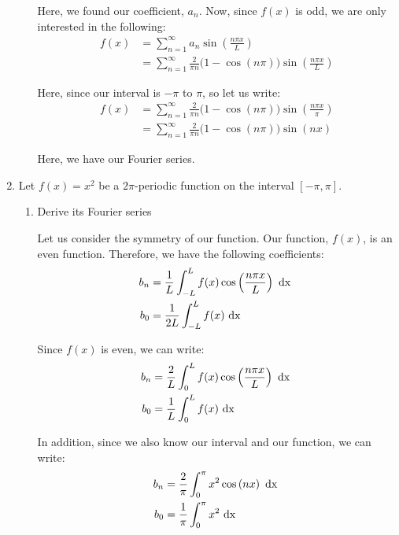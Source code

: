 \documentclass{article}
\begin{document}
\begin{enumerate}
\begin{enumerate}
    Here, we found our coefficient, $a_n$. Now, since $f(x)$ is odd, we are only interested in the following:
    \begin{align}
      f(x) & = \sum^\infty_{n = 1} a_n \sin\left( \frac{n \pi x}{L} \right)\\
      & = \sum^\infty_{n = 1}
      \frac{2}{\pi n}\big( 1 - \cos( n \pi ) \big)
      \sin\left( \frac{n \pi x}{L} \right)
    \end{align}

    Here, since our interval is $-\pi$ to $\pi$, so let us write:
    \begin{align}
      f(x) & =
      \sum^\infty_{n = 1}
      \frac{2}{\pi n}\big( 1 - \cos( n \pi ) \big)
      \sin\left( \frac{n \pi x}{\pi} \right)\\
      & =
      \sum^\infty_{n = 1}
      \frac{2}{\pi n}\big( 1 - \cos( n \pi ) \big)
      \sin\left( n x \right)
    \end{align}

    Here, we have our Fourier series.
%
%
\newpage
\setcounter{equation}{0}
%
%
\end{enumerate}
  \item Let $f(x) = x^2$ be a $2 \pi$-periodic function on the interval $[-\pi, \pi]$.
  \begin{enumerate}
    \item Derive its Fourier series

    Let us consider the symmetry of our function. Our function, $f(x)$, is an even function. Therefore, we have the following coefficients:
%
    \begin{align}
      b_n & = \frac{1}{L}  \int^L_{-L} f(x) \cos\left( \frac{n \pi x}{L} \right) \text{ dx }\\
      b_0 & = \frac{1}{2L} \int^L_{-L} f(x) \text{ dx }
    \end{align}

    Since $f(x)$ is even, we can write:
    \begin{align}
      b_n & = \frac{2}{L}  \int^L_0 f(x) \cos\left( \frac{n \pi x}{L} \right) \text{ dx }\\
      b_0 & = \frac{1}{L} \int^L_0 f(x) \text{ dx }
    \end{align}

    In addition, since we also know our interval and our function, we can write:
    \begin{align}
      b_n & = \frac{2}{\pi} \int^\pi_0 x^2 \cos\left( n x \right) \text{ dx }\\
      b_0 & = \frac{1}{\pi} \int^\pi_0 x^2 \text{ dx }
    \end{align}


\end{enumerate}
\end{enumerate}
\end{document}
